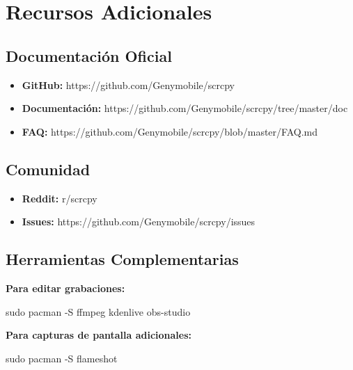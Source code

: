 \documentclass[
  doc,
  floatsintext,
  longtable,
  a4paper,
  nolmodern,
  notxfonts,
  notimes,
  12pt,
  colorlinks=true,linkcolor=blue,citecolor=blue,urlcolor=blue]{apa7}
\newenvironment{Shaded}{\begin{snugshade}}{\end{snugshade}}
\newcommand{\AttributeTok}[1]{\textcolor[rgb]{0.40,0.45,0.13}{#1}}
\newcommand{\FunctionTok}[1]{\textcolor[rgb]{0.28,0.35,0.67}{#1}}
\newcommand{\NormalTok}[1]{\textcolor[rgb]{0.00,0.23,0.31}{#1}}
\providecommand{\tightlist}{%
  \setlength{\itemsep}{0pt}\setlength{\parskip}{0pt}}
\begin{document}
\section{Recursos Adicionales}\label{recursos-adicionales}

\subsection{Documentación Oficial}\label{documentaciuxf3n-oficial}

\begin{itemize}
\tightlist
\item
  \textbf{GitHub:} https://github.com/Genymobile/scrcpy
\item
  \textbf{Documentación:}
  https://github.com/Genymobile/scrcpy/tree/master/doc
\item
  \textbf{FAQ:} https://github.com/Genymobile/scrcpy/blob/master/FAQ.md
\end{itemize}

\subsection{Comunidad}\label{comunidad}

\begin{itemize}
\tightlist
\item
  \textbf{Reddit:} r/scrcpy
\item
  \textbf{Issues:} https://github.com/Genymobile/scrcpy/issues
\end{itemize}

\subsection{Herramientas
Complementarias}\label{herramientas-complementarias}

\textbf{Para editar grabaciones:}

\begin{Shaded}
\begin{Highlighting}[]
\FunctionTok{sudo}\NormalTok{ pacman }\AttributeTok{{-}S}\NormalTok{ ffmpeg kdenlive obs{-}studio}
\end{Highlighting}
\end{Shaded}

\textbf{Para capturas de pantalla adicionales:}

\begin{Shaded}
\begin{Highlighting}[]
\FunctionTok{sudo}\NormalTok{ pacman }\AttributeTok{{-}S}\NormalTok{ flameshot}
\end{Highlighting}
\end{Shaded}
\end{document}
